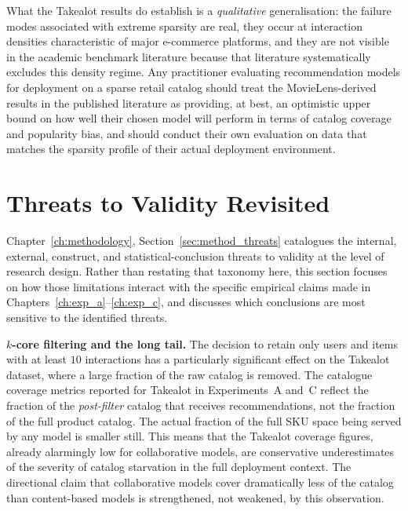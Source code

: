 \documentclass[11pt,a4paper]{report}
\begin{document}
What the Takealot results do establish is a \emph{qualitative} generalisation: the failure modes associated with extreme sparsity are real, they occur at interaction densities characteristic of major e-commerce platforms, and they are not visible in the academic benchmark literature because that literature systematically excludes this density regime. Any practitioner evaluating recommendation models for deployment on a sparse retail catalog should treat the MovieLens-derived results in the published literature as providing, at best, an optimistic upper bound on how well their chosen model will perform in terms of catalog coverage and popularity bias, and should conduct their own evaluation on data that matches the sparsity profile of their actual deployment environment.

\section{Threats to Validity Revisited}
\label{sec:disc_threats}

Chapter~\ref{ch:methodology}, Section~\ref{sec:method_threats} catalogues the internal, external, construct, and statistical-conclusion threats to validity at the level of research design. Rather than restating that taxonomy here, this section focuses on how those limitations interact with the specific empirical claims made in Chapters~\ref{ch:exp_a}--\ref{ch:exp_c}, and discusses which conclusions are most sensitive to the identified threats.

\textbf{$k$-core filtering and the long tail.} The decision to retain only users and items with at least $10$ interactions has a particularly significant effect on the Takealot dataset, where a large fraction of the raw catalog is removed. The catalogue coverage metrics reported for Takealot in Experiments~A and~C reflect the fraction of the \emph{post-filter} catalog that receives recommendations, not the fraction of the full product catalog. The actual fraction of the full SKU space being served by any model is smaller still. This means that the Takealot coverage figures, already alarmingly low for collaborative models, are conservative underestimates of the severity of catalog starvation in the full deployment context. The directional claim that collaborative models cover dramatically less of the catalog than content-based models is strengthened, not weakened, by this observation.
\end{document}
